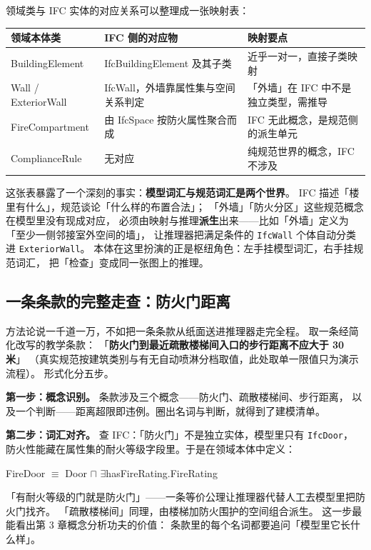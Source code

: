 领域类与 IFC 实体的对应关系可以整理成一张映射表：

\begin{center}
\begin{tabularx}{\linewidth}{@{}lXX@{}}
\toprule
\textbf{领域本体类} & \textbf{IFC 侧的对应物} & \textbf{映射要点} \\
\midrule
BuildingElement & IfcBuildingElement 及其子类 & 近乎一对一，直接子类映射 \\
Wall / ExteriorWall & IfcWall，外墙靠属性集与空间关系判定 & 「外墙」在 IFC 中不是独立类型，需推导 \\
FireCompartment & 由 IfcSpace 按防火属性聚合而成 & IFC 无此概念，是规范侧的派生单元 \\
ComplianceRule & 无对应 & 纯规范世界的概念，IFC 不涉及 \\
\bottomrule
\end{tabularx}
\end{center}

这张表暴露了一个深刻的事实：\textbf{模型词汇与规范词汇是两个世界}。
IFC 描述「楼里有什么」，规范谈论「什么样的布置合法」；
「外墙」「防火分区」这些规范概念在模型里没有现成对应，
必须由映射与推理\textbf{派生}出来——比如「外墙」定义为「至少一侧邻接室外空间的墙」，
让推理器把满足条件的 \texttt{IfcWall} 个体自动分类进 \texttt{ExteriorWall}。
本体在这里扮演的正是枢纽角色：左手挂模型词汇，右手挂规范词汇，
把「检查」变成同一张图上的推理。

\subsection{一条条款的完整走查：防火门距离}

方法论说一千道一万，不如把一条条款从纸面送进推理器走完全程。
取一条经简化改写的教学条款：
「\textbf{防火门到最近疏散楼梯间入口的步行距离不应大于 30 米}」
（真实规范按建筑类别与有无自动喷淋分档取值，此处取单一限值只为演示流程）。
形式化分五步。

\textbf{第一步：概念识别。}
条款涉及三个概念——防火门、疏散楼梯间、步行距离，
以及一个判断——距离超限即违例。圈出名词与判断，就得到了建模清单。

\textbf{第二步：词汇对齐。}
查 IFC：「防火门」不是独立实体，模型里只有 \texttt{IfcDoor}，
防火性能藏在属性集的耐火等级字段里。于是在领域本体中定义：
\begin{center}
FireDoor \(\equiv\) Door \(\sqcap\) \(\exists\)hasFireRating.FireRating
\end{center}
「有耐火等级的门就是防火门」——一条等价公理让推理器代替人工去模型里把防火门找齐。
「疏散楼梯间」同理，由楼梯加防火围护的空间组合派生。
这一步最能看出第 3 章概念分析功夫的价值：
条款里的每个名词都要追问「模型里它长什么样」。

